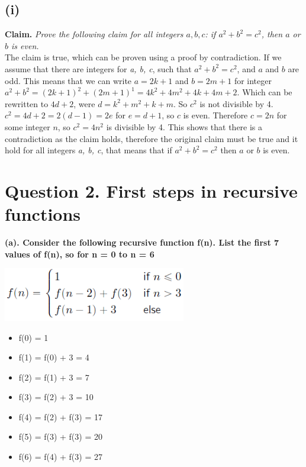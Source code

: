 \documentclass[a4paper]{article}
\begin{document}
\subsection{(i)}
\textbf{Claim.} \textit{Prove the following claim for all integers $a,b,c$: if $a^2 + b^2 = c^2$, then $a$ or $b$ is even.}\\
The claim is true, which can be proven using a proof by contradiction.
If we assume that there are integers for \textit{a, b, c}, such that $a^2 + b^2 = c^2$, and $a$ and $b$ are odd.
This means that we can write $a = 2k + 1$ and $b = 2m + 1$ for integer $a^2 + b^2 = (2k+1)^2 + (2m+1)^1 = 4k^2 + 4m^2 + 4k + 4m + 2$.
Which can be rewritten to $4d + 2$, were $d = k^2 + m^2 + k + m$.
So $c^2$ is not divisible by 4.
$c^2 = 4d + 2 = 2(d - 1) = 2e $ for $e = d + 1$, so $c$ is even.
Therefore $c = 2n$ for some integer $n$, so $c^2 = 4n^2$ is divisible by 4.
This shows that there is a contradiction as the claim holds, therefore the original claim must be true and it hold for all integers \textit{a, b, c}, that means that if $a^2 + b^2 = c^2$ then $a$ or $b$ is even.

\newpage
\section{Question 2. First steps in recursive functions}
\textbf{(a). Consider the following recursive function f(n). List the first 7 values of f(n), so for n = 0 to n = 6}
\begin{center}
    \includegraphics[width=0.6\textwidth]{images/2a.png}\\[1cm]
\end{center}

\begin{itemize}
    \item f(0) = 1
    \item f(1) = f(0) + 3 = 4
    \item f(2) = f(1) + 3 = 7
    \item f(3) = f(2) + 3 = 10
    \item f(4) = f(2) + f(3) = 17
    \item f(5) = f(3) + f(3) = 20
    \item f(6) = f(4) + f(3) = 27
\end{itemize}
\ \\
\end{document}
